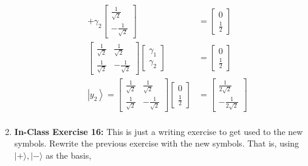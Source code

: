 \documentclass[main.tex]{subfiles}
\begin{document}
\begin{enumerate}
\begin{enumerate}
\begin{align*}
            + \gamma_{2} \left[\begin{array}{l} \frac{1}{\sqrt{2}} \\ -\frac{1}{\sqrt{2}} \end{array}\right]    & = \left[\begin{array}{c} 0 \\ \frac{1}{2} \end{array}\right]\\
            \left[\begin{array}{ll} \frac{1}{\sqrt{2}} & \frac{1}{\sqrt{2}} 
            \\ \frac{1}{\sqrt{2}} & -\frac{1}{\sqrt{2}} \end{array}\right]
            \left[\begin{array}{l} \gamma_{1} \\ \gamma_{2} \end{array}\right]                                  & = \left[\begin{array}{c} 0 \\ \frac{1}{2} \end{array}\right] \tag{matrix is unitary, inverse is the adjoint}\\
            \left|y_{2}\right\rangle =
            \left[\begin{array}{ll} \frac{1}{\sqrt{2}} & \frac{1}{\sqrt{2}} 
            \\ \frac{1}{\sqrt{2}} & -\frac{1}{\sqrt{2}} \end{array}\right]
            \left[\begin{array}{c} 0 \\ \frac{1}{2} \end{array}\right]                                          & = \left[\begin{array}{c} \frac{1}{2\sqrt{2}} \\ -\frac{1}{2\sqrt{2}} \end{array}\right] \tag{new basis}\\
        \end{align*}
    \end{enumerate}

\item[] \textbf{In-Class Exercise 16:} This is just a writing exercise to get used to the new symbols. Rewrite the previous exercise with the new symbols. That is, using $|+\rangle,|-\rangle$ as the basis, 
    

\end{enumerate}
\end{document}
